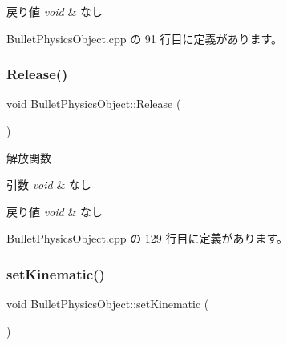 \begin{DoxyRetVals}{戻り値}
{\em void} & なし \\
\hline
\end{DoxyRetVals}


 Bullet\+Physics\+Object.\+cpp の 91 行目に定義があります。

\mbox{\label{class_bullet_physics_object_a0bb55d6e1644f45e35bcb8e2e9c945eb}} 
\subsubsection{\texorpdfstring{Release()}{Release()}}
{\footnotesize\ttfamily void Bullet\+Physics\+Object\+::\+Release (\begin{DoxyParamCaption}{ }\end{DoxyParamCaption})}



解放関数 


\begin{DoxyParams}{引数}
{\em void} & なし \\
\hline
\end{DoxyParams}

\begin{DoxyRetVals}{戻り値}
{\em void} & なし \\
\hline
\end{DoxyRetVals}


 Bullet\+Physics\+Object.\+cpp の 129 行目に定義があります。

\mbox{\label{class_bullet_physics_object_a563a3aa01fc011dbff8aa64097d7c5a8}} 
\subsubsection{\texorpdfstring{set\+Kinematic()}{setKinematic()}}
{\footnotesize\ttfamily void Bullet\+Physics\+Object\+::set\+Kinematic (\begin{DoxyParamCaption}{ }\end{DoxyParamCaption})}



